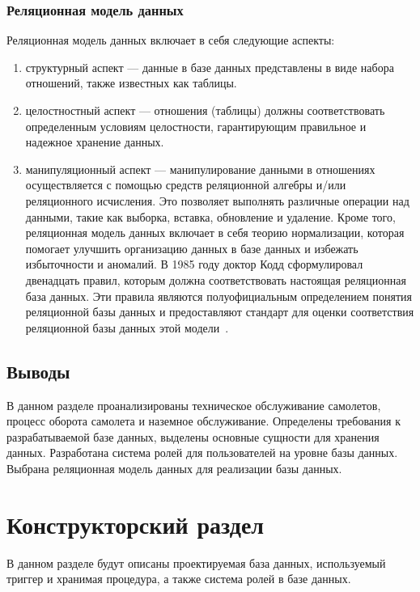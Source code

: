 \subsection{Реляционная модель данных}
Реляционная модель данных включает в себя следующие аспекты:

\begin{enumerate}[label=\arabic*)]
    \item структурный аспект --- данные в базе данных представлены в виде набора отношений, также известных как таблицы.
    \item целостностный аспект --- отношения (таблицы) должны соответствовать определенным условиям целостности, гарантирующим правильное и надежное хранение данных.
    \item манипуляционный аспект --- манипулирование данными в отношениях осуществляется с помощью средств реляционной алгебры и/или реляционного исчисления.
    Это позволяет выполнять различные операции над данными, такие как выборка, вставка, обновление и удаление.
    Кроме того, реляционная модель данных включает в себя теорию нормализации, которая помогает улучшить организацию данных в базе данных и избежать избыточности и аномалий.
    В 1985 году доктор Кодд сформулировал двенадцать правил, которым должна соответствовать настоящая реляционная база данных.
    Эти правила являются полуофициальным определением понятия реляционной базы данных и предоставляют стандарт для оценки соответствия реляционной базы данных этой модели~\cite{lekcii}.
\end{enumerate}


\section*{Выводы}
В данном разделе проанализированы техническое обслуживание самолетов, процесс оборота самолета и наземное обслуживание.
Определены требования к разрабатываемой базе данных, выделены основные сущности для хранения данных.
Разработана система ролей для пользователей на уровне базы данных.
Выбрана реляционная модель данных для реализации базы данных.


\chapter{Конструкторский раздел}

В данном разделе будут описаны проектируемая база данных, используемый триггер и хранимая процедура, а также система ролей в базе данных.

